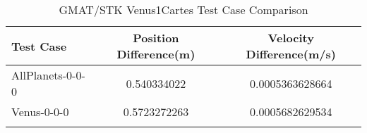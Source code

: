 \begin{table}[htbp!]
\centering
\caption{ GMAT/STK Venus1Cartes Test Case Comparison}
      \begin{tabular}{lcc}
      \hline\hline
          Test Case & Position Difference(m) & Velocity Difference(m/s) \\
         \hline
         AllPlanets-0-0-0 & 0.540334022 & 0.0005363628664 \\
         Venus-0-0-0 & 0.5723272263 & 0.0005682629534 \\
      \hline\hline
      \label{Table: Venus1CartesTable} 
\end{tabular}
\end{table}
